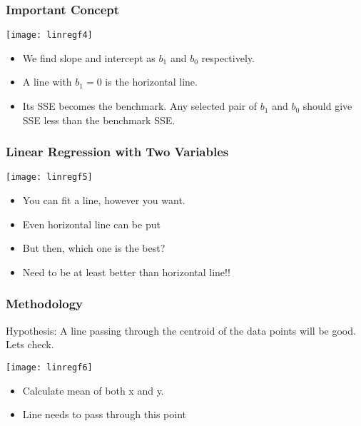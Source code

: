 \begin{frame}[fragile]\frametitle{Important Concept}
\begin{center}
\texttt{[image: linregf4]}
\end{center}
\begin{itemize}
\item We find slope and intercept as $b_1$ and $b_0$ respectively.
\item A line with $b_1 = 0$ is the horizontal line.
\item Its SSE becomes the benchmark. Any selected pair of $b_1$ and $b_0$ should give SSE less than the benchmark SSE.
\end{itemize}
\end{frame}

\begin{frame}[fragile]\frametitle{Linear Regression with Two Variables}
\begin{center}
\texttt{[image: linregf5]}
\end{center}
\begin{itemize}
\item You can fit a line, however you want.
\item Even horizontal line can be put
\item But then, which one is the best?
\item Need to be at least better than horizontal line!!
\end{itemize}
\end{frame}

\begin{frame}[fragile]\frametitle{Methodology}
Hypothesis: A line passing through the centroid of the data points will be good. Lets check.

\begin{center}
\texttt{[image: linregf6]}
\end{center}
\begin{itemize}
\item Calculate mean of both x and y.
\item Line needs to pass through this point
\end{itemize}
\end{frame}


